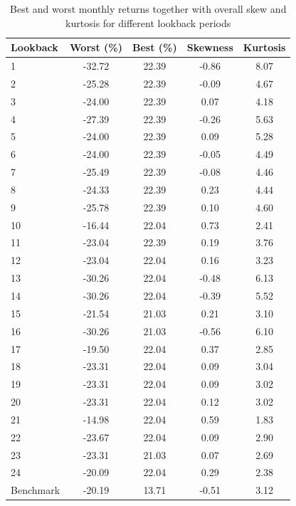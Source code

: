 \documentclass[a4paper,12pt,twoside]{article}
\begin{document}
\begin{table}[ht]
\centering
\begin{tabular}{@{}l
                c
                c
                c
                c@{}}
\toprule
Lookback & Worst (\%) & Best (\%)   & Skewness & Kurtosis \\
\midrule
1        & -32.72 & 22.39  & -0.86    & 8.07     \\
2        & -25.28 & 22.39  & -0.09    & 4.67     \\
3        & -24.00 & 22.39  & 0.07     & 4.18     \\
4        & -27.39 & 22.39  & -0.26    & 5.63     \\
5        & -24.00 & 22.39  & 0.09     & 5.28     \\
6        & -24.00 & 22.39  & -0.05    & 4.49     \\
7        & -25.49 & 22.39  & -0.08    & 4.46     \\
8        & -24.33 & 22.39  & 0.23     & 4.44     \\
9        & -25.78 & 22.39  & 0.10     & 4.60     \\
10       & -16.44 & 22.04  & 0.73     & 2.41     \\
11       & -23.04 & 22.39  & 0.19     & 3.76     \\
12       & -23.04 & 22.04  & 0.16     & 3.23     \\
13       & -30.26 & 22.04  & -0.48    & 6.13     \\
14       & -30.26 & 22.04  & -0.39    & 5.52     \\
15       & -21.54 & 21.03  & 0.21     & 3.10     \\
16       & -30.26 & 21.03  & -0.56    & 6.10     \\
17       & -19.50 & 22.04  & 0.37     & 2.85     \\
18       & -23.31 & 22.04  & 0.09     & 3.04     \\
19       & -23.31 & 22.04  & 0.09     & 3.02     \\
20       & -23.31 & 22.04  & 0.12     & 3.02     \\
21       & -14.98 & 22.04  & 0.59     & 1.83     \\
22       & -23.67 & 22.04  & 0.09     & 2.90     \\
23       & -23.31 & 21.03  & 0.07     & 2.69     \\
24       & -20.09 & 22.04  & 0.29     & 2.38     \\
\midrule
Benchmark & -20.19 & 13.71  & -0.51    & 3.12     \\
\bottomrule
\end{tabular}
\caption{Best and worst monthly returns together with overall skew and kurtosis for different lookback periods}
\label{table:performance2}
\end{table}
\end{document}
